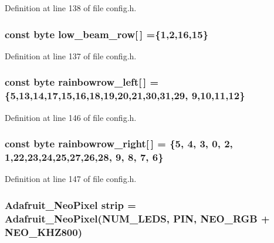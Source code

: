 Definition at line 138 of file config.\+h.

\subsubsection[{\texorpdfstring{low\+\_\+beam\+\_\+row}{low_beam_row}}]{\setlength{\rightskip}{0pt plus 5cm}const byte low\+\_\+beam\+\_\+row\mbox{[}$\,$\mbox{]} =\{1,2,16,15\}}\hypertarget{group__deployment_ga1a25903a2850d9849775664473070489}{}\label{group__deployment_ga1a25903a2850d9849775664473070489}


Definition at line 137 of file config.\+h.

\subsubsection[{\texorpdfstring{rainbowrow\+\_\+left}{rainbowrow_left}}]{\setlength{\rightskip}{0pt plus 5cm}const byte rainbowrow\+\_\+left\mbox{[}$\,$\mbox{]} = \{5,13,14,17,15,16,18,19,20,21,30,31,29, 9,10,11,12\}}\hypertarget{group__deployment_gad4e8497757364dbc8187298bd87acc44}{}\label{group__deployment_gad4e8497757364dbc8187298bd87acc44}


Definition at line 146 of file config.\+h.

\subsubsection[{\texorpdfstring{rainbowrow\+\_\+right}{rainbowrow_right}}]{\setlength{\rightskip}{0pt plus 5cm}const byte rainbowrow\+\_\+right\mbox{[}$\,$\mbox{]} = \{5, 4, 3, 0, 2, 1,22,23,24,25,27,26,28, 9, 8, 7, 6\}}\hypertarget{group__deployment_ga00c047fede9a8b6c020ba1d108d63cea}{}\label{group__deployment_ga00c047fede9a8b6c020ba1d108d63cea}


Definition at line 147 of file config.\+h.

\subsubsection[{\texorpdfstring{strip}{strip}}]{\setlength{\rightskip}{0pt plus 5cm}Adafruit\+\_\+\+Neo\+Pixel strip = Adafruit\+\_\+\+Neo\+Pixel({\bf N\+U\+M\+\_\+\+L\+E\+DS}, {\bf P\+IN}, N\+E\+O\+\_\+\+R\+GB + N\+E\+O\+\_\+\+K\+H\+Z800)}\hypertarget{group__deployment_gacf2771bd8bfaf855bbcc6c30301bf380}{}\label{group__deployment_gacf2771bd8bfaf855bbcc6c30301bf380}


